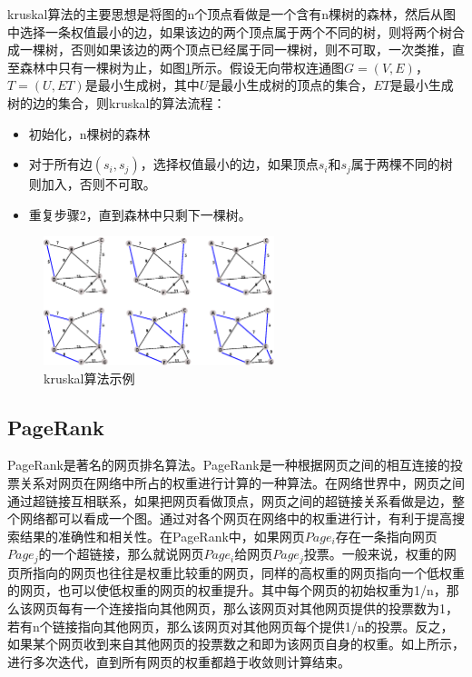 kruskal算法的主要思想是将图的n个顶点看做是一个含有n棵树的森林，然后从图中选择一条权值最小的边，如果该边的两个顶点属于两个不同的树，则将两个树合成一棵树，否则如果该边的两个顶点已经属于同一棵树，则不可取，一次类推，直至森林中只有一棵树为止，如图\ref{fig:kruskal}所示。假设无向带权连通图$G=(V,E)$，$T=(U,ET)$是最小生成树，其中$U$是最小生成树的顶点的集合，$ET$是最小生成树的边的集合，则kruskal的算法流程：
\begin{itemize}
\item 初始化，n棵树的森林
\item 对于所有边$(s_i,s_j)$，选择权值最小的边，如果顶点$s_i$和$s_j$属于两棵不同的树则加入，否则不可取。
\item 重复步骤2，直到森林中只剩下一棵树。
\end{itemize}

\begin{figure}[htbp]
\centering
\includegraphics[width=0.6\textwidth]{myfigures/kruskal}
\caption{kruskal算法示例}\label{fig:kruskal}
\vspace{\baselineskip}
\end{figure}

\subsection{PageRank}

PageRank是著名的网页排名算法。PageRank是一种根据网页之间的相互连接的投票关系对网页在网络中所占的权重进行计算的一种算法。在网络世界中，网页之间通过超链接互相联系，如果把网页看做顶点，网页之间的超链接关系看做是边，整个网络都可以看成一个图。通过对各个网页在网络中的权重进行计，有利于提高搜索结果的准确性和相关性。在PageRank中，如果网页$Page_i$存在一条指向网页$Page_j$的一个超链接，那么就说网页$Page_i$给网页$Page_j$投票。一般来说，权重的网页所指向的网页也往往是权重比较重的网页，同样的高权重的网页指向一个低权重的网页，也可以使低权重的网页的权重提升。其中每个网页的初始权重为1/n，那么该网页每有一个连接指向其他网页，那么该网页对其他网页提供的投票数为1，若有n个链接指向其他网页，那么该网页对其他网页每个提供1/n的投票。反之，如果某个网页收到来自其他网页的投票数之和即为该网页自身的权重。如上所示，进行多次迭代，直到所有网页的权重都趋于收敛则计算结束。

